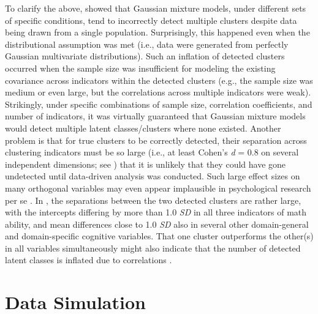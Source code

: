 \documentclass[letterpaper,11pt]{article}
\begin{document}
To clarify the above,  showed that Gaussian mixture models, under different sets of specific conditions, tend to incorrectly detect multiple clusters despite data being drawn from a single population. Surprisingly, this happened even when the distributional assumption was met (i.e., data were generated from perfectly Gaussian multivariate distributions). Such an inflation of detected clusters occurred when the sample size was insufficient for modeling the existing covariance across indicators within the detected clusters (e.g., the sample size was medium or even large, but the correlations across multiple indicators were weak). Strikingly, under specific combinations of sample size, correlation coefficients, and number of indicators, it was virtually guaranteed that Gaussian mixture models would detect multiple latent classes/clusters where none existed. Another problem is that for true clusters to be correctly detected, their separation across clustering indicators must be so large (i.e., at least Cohen’s \textit{d} = 0.8 on several independent dimensions; see ) that it is unlikely that they could have gone undetected until data-driven analysis was conducted. Such large effect sizes on many orthogonal variables may even appear implausible in psychological research per se \cite{toffalini2022entia}. In , the separations between the two detected clusters are rather large, with the intercepts differing by more than 1.0 \textit{SD} in all three indicators of math ability, and mean differences close to 1.0 \textit{SD} also in several other domain-general and domain-specific cognitive variables. That one cluster outperforms the other(s) in all variables simultaneously might also indicate that the number of detected latent classes is inflated due to correlations \cite{toffalini2022entia}. 

\section*{Data Simulation}
\end{document}
